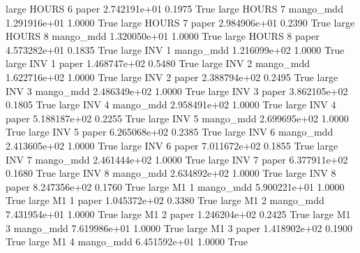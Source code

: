      large    HOURS                 6                 paper 2.742191e+01      0.1975    True
     large    HOURS                 7             mango_mdd 1.291916e+01      1.0000    True
     large    HOURS                 7                 paper 2.984906e+01      0.2390    True
     large    HOURS                 8             mango_mdd 1.320050e+01      1.0000    True
     large    HOURS                 8                 paper 4.573282e+01      0.1835    True
     large      INV                 1             mango_mdd 1.216099e+02      1.0000    True
     large      INV                 1                 paper 1.468747e+02      0.5480    True
     large      INV                 2             mango_mdd 1.622716e+02      1.0000    True
     large      INV                 2                 paper 2.388794e+02      0.2495    True
     large      INV                 3             mango_mdd 2.486349e+02      1.0000    True
     large      INV                 3                 paper 3.862105e+02      0.1805    True
     large      INV                 4             mango_mdd 2.958491e+02      1.0000    True
     large      INV                 4                 paper 5.188187e+02      0.2255    True
     large      INV                 5             mango_mdd 2.699695e+02      1.0000    True
     large      INV                 5                 paper 6.265068e+02      0.2385    True
     large      INV                 6             mango_mdd 2.413605e+02      1.0000    True
     large      INV                 6                 paper 7.011672e+02      0.1855    True
     large      INV                 7             mango_mdd 2.461444e+02      1.0000    True
     large      INV                 7                 paper 6.377911e+02      0.1680    True
     large      INV                 8             mango_mdd 2.634892e+02      1.0000    True
     large      INV                 8                 paper 8.247356e+02      0.1760    True
     large       M1                 1             mango_mdd 5.900221e+01      1.0000    True
     large       M1                 1                 paper 1.045372e+02      0.3380    True
     large       M1                 2             mango_mdd 7.431954e+01      1.0000    True
     large       M1                 2                 paper 1.246204e+02      0.2425    True
     large       M1                 3             mango_mdd 7.619986e+01      1.0000    True
     large       M1                 3                 paper 1.418902e+02      0.1900    True
     large       M1                 4             mango_mdd 6.451592e+01      1.0000    True
